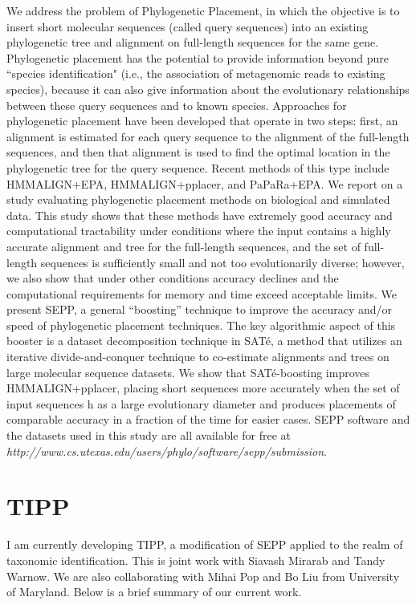 \documentclass[times, 10pt]{article}
\begin{document}
We address the problem of Phylogenetic Placement, in which the objective is to insert short molecular sequences (called query sequences) into an existing phylogenetic tree and alignment on full-length sequences for the same gene. Phylogenetic placement has the potential to provide information beyond pure ``species identification" (i.e., the association of metagenomic reads to existing species), because it can also give information about the evolutionary relationships between these query sequences and to known species. Approaches for phylogenetic placement have been developed that operate in two steps: first, an alignment is estimated for each query sequence to the alignment of the full-length sequences, and then that alignment is used to find the optimal location in the phylogenetic tree for the query sequence. Recent methods of this type include HMMALIGN+EPA, HMMALIGN+pplacer, and PaPaRa+EPA. We report on a study evaluating phylogenetic placement methods on biological and simulated data. This study shows that these methods have extremely good accuracy and computational tractability under conditions where the input contains a highly accurate alignment and tree for the full-length sequences, and the set of full-length sequences is sufficiently small and not too evolutionarily diverse; however, we also show that under other conditions accuracy declines and the computational requirements for memory and time exceed acceptable limits. We present SEPP, a general “boosting” technique to improve the accuracy and/or speed of phylogenetic placement techniques. The key algorithmic aspect of this booster is a dataset decomposition technique in SAT\'{e}, a method that utilizes an iterative divide-and-conquer technique to co-estimate alignments and trees on large molecular sequence datasets. We show that SAT\'{e}-boosting improves HMMALIGN+pplacer, placing short sequences more accurately when the set of input sequences h as a large evolutionary diameter and produces placements of comparable accuracy in a fraction of the time for easier cases. SEPP software and the datasets used in this study are all available for free at \emph{http://www.cs.utexas.edu/users/phylo/software/sepp/submission}.

\section{TIPP}
I am currently developing TIPP, a modification of SEPP applied to the realm of taxonomic identification.  This is joint work with Siavash Mirarab and Tandy Warnow.  We are also collaborating with Mihai Pop and Bo Liu from University of Maryland.  Below is a brief summary of our current work.
\end{document}
